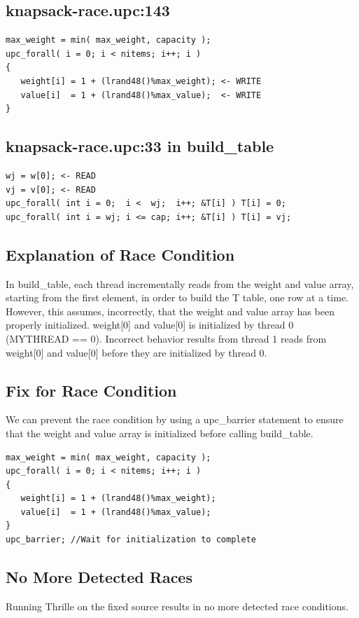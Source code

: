 \documentclass[11pt]{article} %
\begin{document}
\subsection*{knapsack-race.upc:143}
{\tiny
\begin{lstlisting}
max_weight = min( max_weight, capacity );
upc_forall( i = 0; i < nitems; i++; i )
{
   weight[i] = 1 + (lrand48()%max_weight); <- WRITE
   value[i]  = 1 + (lrand48()%max_value);  <- WRITE
}
\end{lstlisting}
}

\subsection*{knapsack-race.upc:33 in build\_table}
{\tiny
\begin{lstlisting}
wj = w[0]; <- READ
vj = v[0]; <- READ
upc_forall( int i = 0;  i <  wj;  i++; &T[i] ) T[i] = 0;
upc_forall( int i = wj; i <= cap; i++; &T[i] ) T[i] = vj;
\end{lstlisting}
}

\subsection{Explanation of Race Condition}

In build\_table, each thread incrementally reads from the weight and value array, starting from the first element, in order to build the T table, one row at a time. However, this assumes, incorrectly, that the weight and value array has been properly initialized. weight[0] and value[0] is initialized by thread 0 (MYTHREAD == 0). Incorrect behavior results from thread 1 reads from weight[0] and value[0] before they are initialized by thread 0.

\subsection{Fix for Race Condition}
We can prevent the race condition by using a upc\_barrier statement to ensure that the weight and value array is initialized before calling build\_table. 

{\tiny
\begin{lstlisting}
max_weight = min( max_weight, capacity );
upc_forall( i = 0; i < nitems; i++; i )
{
   weight[i] = 1 + (lrand48()%max_weight);
   value[i]  = 1 + (lrand48()%max_value);
}
upc_barrier; //Wait for initialization to complete
\end{lstlisting}
}

\subsection{No More Detected Races}
Running Thrille on the fixed source results in no more detected race conditions.
\end{document}
